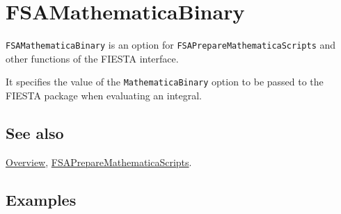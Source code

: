 \documentclass[../FeynHelpersManual.tex]{subfiles}
\begin{document}
\begin{Shaded}
\begin{Highlighting}[]
 
\end{Highlighting}
\end{Shaded}

\hypertarget{fsamathematicabinary}{
\section{FSAMathematicaBinary}\label{fsamathematicabinary}}

\texttt{FSAMathematicaBinary} is an option for
\texttt{FSAPrepareMathematicaScripts} and other functions of the FIESTA
interface.

It specifies the value of the \texttt{MathematicaBinary} option to be
passed to the FIESTA package when evaluating an integral.

\subsection{See also}

\hyperlink{toc}{Overview},
\hyperlink{fsapreparemathematicascripts}{FSAPrepareMathematicaScripts}.

\subsection{Examples}
\end{document}
